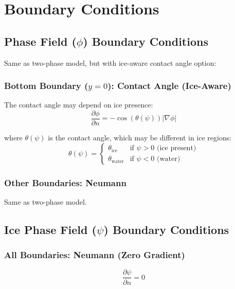 \documentclass[12pt]{article}
\begin{document}
\section{Boundary Conditions}

\subsection{Phase Field ($\phi$) Boundary Conditions}

Same as two-phase model, but with ice-aware contact angle option:

\subsubsection{Bottom Boundary ($y = 0$): Contact Angle (Ice-Aware)}

The contact angle may depend on ice presence:
\begin{equation}
\frac{\partial \phi}{\partial n} = -\cos(\theta(\psi)) |\nabla \phi|
\label{eq:contact_angle_ice_aware}
\end{equation}

where $\theta(\psi)$ is the contact angle, which may be different in ice regions:
\begin{equation}
\theta(\psi) = \begin{cases}
\theta_{\text{ice}} & \text{if } \psi > 0 \text{ (ice present)} \\
\theta_{\text{water}} & \text{if } \psi < 0 \text{ (water)}
\end{cases}
\end{equation}

\subsubsection{Other Boundaries: Neumann}

Same as two-phase model.

\subsection{Ice Phase Field ($\psi$) Boundary Conditions}

\subsubsection{All Boundaries: Neumann (Zero Gradient)}

\begin{equation}
\frac{\partial \psi}{\partial n} = 0
\label{eq:ice_neumann}
\end{equation}
\end{document}
